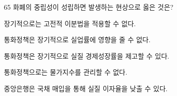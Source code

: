 \begin{question}{65}
화폐의 중립성이 성립하면 발생하는 현상으로 옳은 것은?
\begin{choices}
  \item 장기적으로는 고전적 이분법을 적용할 수 없다.
  \item 통화정책은 장기적으로 실업률에 영향을 줄 수 없다.
  \item 통화정책은 장기적으로 실질 경제성장률을 제고할 수 있다.
  \item 통화정책으로는 물가지수를 관리할 수 없다.
  \item 중앙은행은 국채 매입을 통해 실질 이자율을 낮출 수 있다.
\end{choices}
\end{question}
